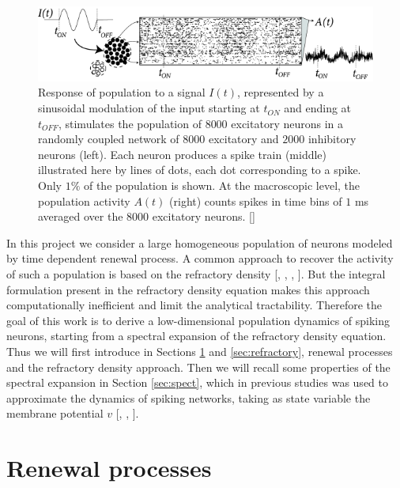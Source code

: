 \documentclass[12pt,twoside]{report}
\begin{document}
\begin{figure}[h!]
	\centering
	\includegraphics[width=0.8\linewidth]{x285.png}
	\caption{ Response of population to a signal $I(t)$, represented by a sinusoidal modulation of the input starting at $t_{ON}$ and ending at $t_{OFF}$, stimulates the population of $8 000$ excitatory neurons in a randomly coupled network of $8 000$ excitatory and $2 000$ inhibitory neurons (left). Each neuron produces a spike train (middle) illustrated here by lines of dots, each dot corresponding to a spike. Only $1\%$ of the population is shown. At the macroscopic level, the population activity $A(t)$ (right) counts spikes in time bins of $1$ ms averaged over the $8 000$ excitatory neurons. [\cite{GerKis14}] }
	\label{fig:x285}
\end{figure}

In this project we consider a large homogeneous population of neurons modeled by time dependent renewal process. A common approach to recover the activity of such a population is based on the refractory density [\cite{Ger00}, \cite{ChiGra07}, \cite{ChiGra08}, \cite{SchDeg17}]. But the integral formulation present in the refractory density equation makes this approach computationally inefficient and limit the analytical tractability. Therefore the goal of this work is to derive a low-dimensional population dynamics of spiking neurons, starting from a spectral expansion of the refractory density equation. Thus we will first introduce in Sections \ref{sec:renew} and \ref{sec:refractory}, renewal processes and the refractory density approach. Then we will recall some properties of the spectral expansion in Section \ref{sec:spect}, which in previous studies was used to approximate the dynamics of spiking networks, taking as state variable the membrane potential $v$ [\cite{MatGiu02}, \cite{SchOst13}, \cite{AugLad17}].


\section{Renewal processes} %
\label{sec:renew}

\end{document}
